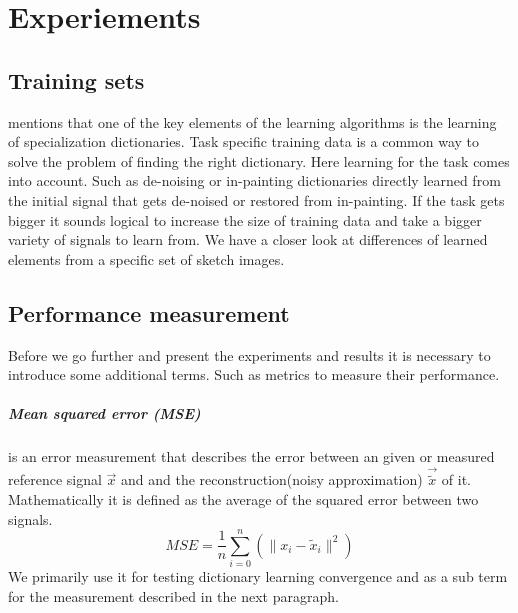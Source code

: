 \chapter{Experiements}

\section{Training sets}
 mentions that one of the key
elements of the learning algorithms is the learning of specialization
dictionaries. Task specific training data is a common way to solve the problem
of finding  the right dictionary. Here learning for the task comes into
account. Such as de-noising or in-painting dictionaries directly learned from
the initial signal that gets de-noised or restored from in-painting. If the task
gets bigger it sounds logical to increase the size of training data and take a
bigger variety of signals to learn from.  We have a closer look at differences
of learned elements from a specific set of sketch images.

\section{Performance measurement}
Before we go further and present the experiments and results it is necessary to
introduce some additional terms. Such as metrics to measure their performance.

\paragraph{Mean squared error (MSE)} is an error measurement that
describes the error between an given or measured reference signal $\vec{x}$
and and the reconstruction(noisy approximation) $\vec{\tilde{x}}$ of it.
Mathematically it is defined as the average of the squared error between two
signals.
\begin{equation*}
 MSE = \frac{1}{n} \sum_{i=0}^{n} \left( {\lVert x_i -
\tilde{x}_i\rVert^{2}}\right)
\end{equation*}
We primarily use it for testing dictionary learning convergence and as a
sub term for the measurement described in the next paragraph.

